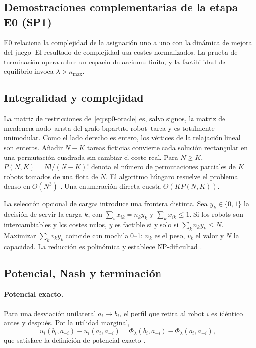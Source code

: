 \subsection{Demostraciones complementarias de la etapa E0 (SP1)}
\label{app:sp0-proofs}

E0 relaciona la complejidad de la asignación uno a uno con la dinámica de mejora del juego. El resultado de complejidad usa costes normalizados. La prueba de terminación opera sobre un espacio de acciones finito, y la factibilidad del equilibrio invoca \(\lambda>\kappa_{\max}\).

\subsection{Integralidad y complejidad}
\label{app:proof-sp0-complexity}

La matriz de restricciones de~\eqref{eq:sp0-oracle} es, salvo signos, la matriz de incidencia nodo--arista del grafo bipartito robot--tarea y es totalmente unimodular. Como el lado derecho es entero, los vértices de la relajación lineal son enteros. Añadir $N-K$ tareas ficticias convierte cada solución rectangular en una permutación cuadrada sin cambiar el coste real. Para $N\geq K$, $P(N,K)=N!/(N-K)!$ denota el número de permutaciones parciales de $K$ robots tomados de una flota de $N$. El algoritmo húngaro resuelve el problema denso en $O(N^3)$ \parencite{kuhn1955Hungarian}. Una enumeración directa cuesta $\Theta(KP(N,K))$.

La selección opcional de cargas introduce una frontera distinta. Sea $y_k\in\{0, 1\}$ la decisión de servir la carga $k$, con $\sum_i x_{ik}=n_ky_k$ y $\sum_kx_{ik}\leq1$. Si los robots son intercambiables y los costes nulos, $y$ es factible si y solo si $\sum_kn_ky_k\leq N$. Maximizar $\sum_kv_ky_k$ coincide con mochila 0--1: $n_k$ es el peso, $v_k$ el valor y $N$ la capacidad. La reducción es polinómica y establece NP-dificultad \parencite{karp1972reducibility}.

\subsection{Potencial, Nash y terminación}

\paragraph{Potencial exacto.}
Para una desviación unilateral $a_i\rightarrow b_i$, el perfil que retira al robot $i$ es idéntico antes y después. Por la utilidad marginal,
\[
u_i(b_i,a_{-i})-u_i(a_i,a_{-i})
=\Phi_\lambda(b_i,a_{-i})-\Phi_\lambda(a_i,a_{-i}),
\]
que satisface la definición de potencial exacto \parencite{monderer1996potential}.

